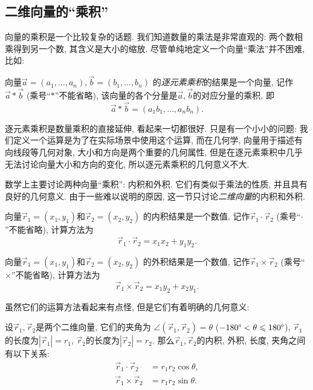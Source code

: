 \subsection{二维向量的``乘积''}

向量的乘积是一个比较复杂的话题.
我们知道数量的乘法是非常直观的:
两个数相乘得到另一个数, 其含义是大小的缩放.
尽管单纯地定义一个向量``乘法''并不困难, 比如:

\begin{definition}[逐元素乘积]
  向量$\vec{a}=(a_1,\dots,a_n),\vec{b}=(b_1,\dots,b_n)$
  的\emph{逐元素乘积}的结果是一个向量, 记作$\vec{a}*\vec{b}$
  (乘号``$*$''不能省略),
  该向量的各个分量是$\vec{a},\vec{b}$的对应分量的乘积, 即
  \[
    \vec{a}*\vec{b} = (a_1b_1,\dots,a_nb_n).
  \]
\end{definition}

逐元素乘积是数量乘积的直接延伸, 看起来一切都很好.
只是有一个小小的问题: 我们定义一个运算是为了在实际场景中使用这个运算,
而在几何学, 向量用于描述有向线段等几何对象,
大小和方向是两个重要的几何属性,
但是在逐元素乘积中几乎无法讨论向量大小和方向的变化,
所以逐元素乘积的几何意义不大.

数学上主要讨论两种向量``乘积'': 内积和外积.
它们有类似于乘法的性质, 并且具有良好的几何意义.
由于一些难以说明的原因, 这一节只讨论\emph{二维向量}的内积和外积.

\begin{definition}[二维向量的内积]
  向量$\vec r_1=(x_1,y_1)$和$\vec r_2=(x_2,y_2)$
  的内积结果是一个数值, 记作$\vec r_1 \cdot \vec r_2$
  (乘号``$\cdot$''不能省略), 计算方法为
  \[
    \vec r_1 \cdot \vec r_2 = x_1x_2 + y_1y_2.
  \]
\end{definition}

\begin{definition}[二维向量的外积]
  向量$\vec r_1=(x_1,y_1)$和$\vec r_2=(x_2,y_2)$
  的外积结果是一个数值, 记作$\vec r_1 \times \vec r_2$
  (乘号``$\times$''不能省略), 计算方法为
  \[
    \vec r_1 \times \vec r_2 = x_1y_2 + x_2y_1.
  \]
\end{definition}

虽然它们的运算方法看起来有点怪,
但是它们有着明确的几何意义:

\begin{theorem}[内积与外积的几何意义]
  设$\vec r_1,\vec r_2$是两个二维向量, 它们的夹角为
  $\angle(\vec r_1,\vec r_2) = \theta$
  ($-180\degree < \theta \leqslant 180\degree$),
  $\vec r_1$的长度为$|\vec r_1| = r_1$,
  $\vec r_2$的长度为$|\vec r_2| = r_2$.
  那么$\vec r_1,\vec r_2$的内积, 外积, 长度, 夹角之间有以下关系:
  \begin{align*}
    \vec r_1 \cdot \vec r_2  & = r_1 r_2 \cos\theta, \\
    \vec r_1 \times \vec r_2 & = r_1 r_2 \sin\theta.
  \end{align*}
\end{theorem}


